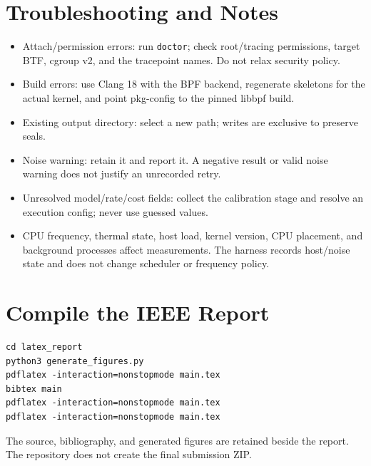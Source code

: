 \documentclass[10pt]{article}
\begin{document}
\section{Troubleshooting and Notes}
\begin{itemize}[nosep,leftmargin=*]
\item Attach/permission errors: run \texttt{doctor}; check root/tracing permissions, target BTF, cgroup v2, and the tracepoint names. Do not relax security policy.
\item Build errors: use Clang 18 with the BPF backend, regenerate skeletons for the actual kernel, and point pkg-config to the pinned libbpf build.
\item Existing output directory: select a new path; writes are exclusive to preserve seals.
\item Noise warning: retain it and report it. A negative result or valid noise warning does not justify an unrecorded retry.
\item Unresolved model/rate/cost fields: collect the calibration stage and resolve an execution config; never use guessed values.
\item CPU frequency, thermal state, host load, kernel version, CPU placement, and background processes affect measurements. The harness records host/noise state and does not change scheduler or frequency policy.
\end{itemize}

\section{Compile the IEEE Report}
\begin{lstlisting}
cd latex_report
python3 generate_figures.py
pdflatex -interaction=nonstopmode main.tex
bibtex main
pdflatex -interaction=nonstopmode main.tex
pdflatex -interaction=nonstopmode main.tex
\end{lstlisting}
The source, bibliography, and generated figures are retained beside the report. The repository does not create the final submission ZIP.
\end{document}
